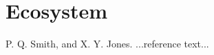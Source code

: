 \documentclass[11pt]{sigplanconf}
\begin{document}
\section{Ecosystem}












\begin{thebibliography}{}
\softraggedright

P. Q. Smith, and X. Y. Jones. ...reference text...

\end{thebibliography}
\end{document}
